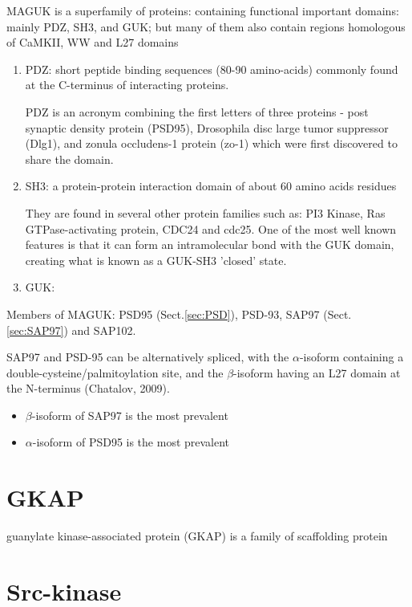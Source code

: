 MAGUK is a superfamily of proteins: containing functional important domains:
mainly PDZ, SH3, and GUK; but many of them also contain regions homologous of
CaMKII, WW and L27 domains
\begin{enumerate}
  \item PDZ: short peptide binding sequences (80-90 amino-acids) commonly found
  at the C-terminus of interacting proteins.
  
  PDZ is an acronym combining the first letters of three proteins - post
  synaptic density protein (PSD95), Drosophila disc large tumor suppressor
  (Dlg1), and zonula occludens-1 protein (zo-1)  which were first discovered to
  share the domain.
  
  \item SH3: a protein-protein interaction domain of
  about 60 amino acids residues 
  
  They are found 
  in several other protein families such as: PI3 Kinase, Ras GTPase-activating
  protein, CDC24 and cdc25. One of the most well known features is that it can
  form an intramolecular bond with the GUK domain, creating what is known as a GUK-SH3 'closed' state.
  
  \item GUK: 
\end{enumerate} 

Members of MAGUK:  PSD95 (Sect.\ref{sec:PSD}), PSD-93, SAP97
(Sect.\ref{sec:SAP97}) and SAP102.

SAP97  and  PSD-95  can be alternatively spliced, with the $\alpha$-isoform
containing a double-cysteine/palmitoylation site, and the $\beta$-isoform having
an L27 domain at the N-terminus (Chatalov, 2009).

\begin{itemize}
  \item $\beta$-isoform of SAP97 is the most prevalent
   
  \item $\alpha$-isoform of PSD95 is the most prevalent
\end{itemize}

\section{GKAP}
\label{sec:GKAP}

guanylate kinase-associated protein (GKAP) is a family of scaffolding protein 



\section{Src-kinase}
\label{sec:Src-kinase}

